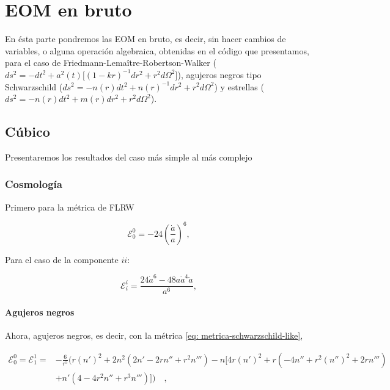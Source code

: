 \documentclass[12pt]{book}
\begin{document}
\chapter{EOM en bruto}

En ésta parte pondremos las EOM en bruto, es decir, sin hacer cambios de variables, o alguna operación algebraica, obtenidas en el código que presentamos, para el caso de Friedmann-Lemaître-Robertson-Walker ($ds^2=-dt^2+a^2(t)[(1-kr)^{-1}dr^2+r^2d\Omega^2$]), agujeros negros tipo Schwarzschild ($ds^2=-n(r)dt^2+n(r)^{-1}dr^2+r^2d\Omega^2$) y estrellas ($ds^2=-n(r)dt^2+m(r)dr^2+r^2d\Omega^2$).

\section{Cúbico}
Presentaremos los resultados del caso más simple al más complejo
\subsection{Cosmología}
Primero para la métrica de FLRW

\begin{equation}
    \mathcal{E}_0^0=-24\left(\frac{\dot{a}}{a}\right)^6\label{eq: ResultadosReales - cubico - FLRW - 00},
\end{equation}

Para el caso de la componente $ii$:

\begin{equation}
    \mathcal{E}_i^i=\frac{24\dot{a}^6-48a\dot{a}^4\ddot{a}}{a^6}\label{eq: ResultadosReales - cubico - FLRW - ii},
\end{equation}

\subsubsection{Agujeros negros}
Ahora, agujeros negros, es decir, con la métrica \eqref{eq: metrica-schwarzschild-like},

\begin{equation}
\begin{split}
    \mathcal{E}_0^0=\mathcal{E}_1^1=&-\frac{6}{r^5}  ( r (n')^2 + 2 n^2  ( 2 n' - 2 r n'' + r^2 n'''  ) - n  [ 4 r (n')^2 + r  ( -4 n'' + r^2 (n'')^2 + 2 r n'''  )  \\ & + n'  ( 4 - 4 r^2 n'' + r^3 n'''  )  ]  ) \label{eq: ResultadosReales - cubico - BH - 00}\quad,
\end{split}
\end{equation}
\end{document}
